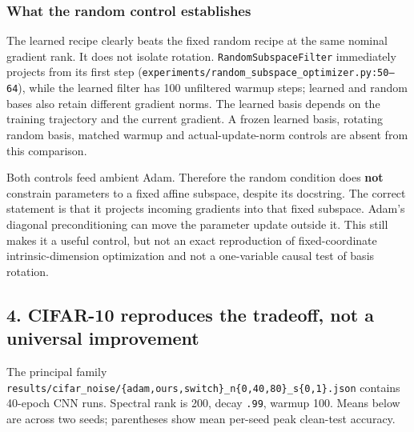 \documentclass[
  british,
  10pt,
  a4paper,
]{article}
\begin{document}
\subsubsection{What the random control
establishes}\label{classical-evidence--what-the-random-control-establishes}

The learned recipe clearly beats the fixed random recipe at the same
nominal gradient rank. It does not isolate rotation.
\texttt{RandomSubspa\allowbreak{}ceFilter} immediately projects from its
first step
(\texttt{experiments/\allowbreak{}random\_\allowbreak{}subspace\_\allowbreak{}optimizer.\allowbreak{}py:\allowbreak{}50–64}),
while the learned filter has 100 unfiltered warmup steps; learned and
random bases also retain different gradient norms. The learned basis
depends on the training trajectory and the current gradient. A frozen
learned basis, rotating random basis, matched warmup and
actual-\allowbreak{}update-\allowbreak{}norm controls are absent from
this comparison.\allowbreak{}

Both controls feed ambient Adam. Therefore the random condition does
\textbf{not} constrain parameters to a fixed affine subspace, despite
its docstring. The correct statement is that it projects incoming
gradients into that fixed subspace. Adam's diagonal preconditioning can
move the parameter update outside it. This still makes it a useful
control, but not an exact reproduction of fixed-\allowbreak{}coordinate
intrinsic-\allowbreak{}dimension optimization and not a
one-\allowbreak{}variable causal test of basis rotation.

\subsection{4. CIFAR-10 reproduces the tradeoff, not a universal
improvement}\label{classical-evidence--cifar-10-reproduces-the-tradeoff-not-a-universal-improvement}

The principal family
\texttt{results/\allowbreak{}cifar\_\allowbreak{}noise/\allowbreak{}\{\allowbreak{}adam,\allowbreak{}ours,\allowbreak{}switch\}\allowbreak{}\_\allowbreak{}n\{\allowbreak{}0,\allowbreak{}40,\allowbreak{}80\}\allowbreak{}\_\allowbreak{}s\{\allowbreak{}0,\allowbreak{}1\}\allowbreak{}.\allowbreak{}json}
contains 40-epoch CNN runs. Spectral rank is 200, decay \texttt{.99},
warmup 100. Means below are across two seeds; parentheses show mean
per-seed peak clean-test accuracy.
\end{document}
